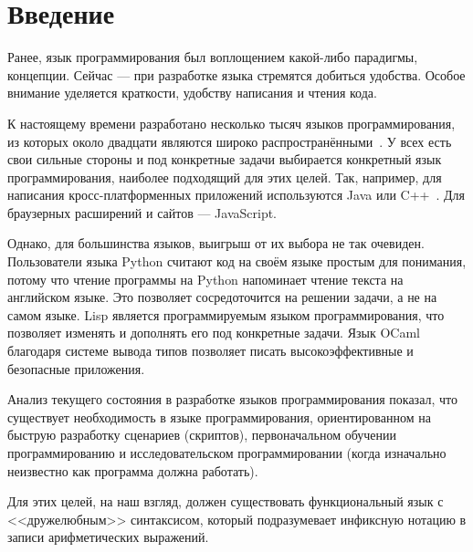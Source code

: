\section*{Введение}
    Ранее, язык программирования был воплощением какой-либо парадигмы, концепции.
    Сейчас --- при разработке языка стремятся добиться удобства.
    Особое внимание уделяется краткости, удобству написания и чтения кода.

    К настоящему времени разработано несколько тысяч языков программирования, из которых около двадцати являются широко распространёнными~\cite{TIOBE}.
    У всех есть свои сильные стороны и под конкретные задачи выбирается конкретный язык программирования, наиболее подходящий для этих целей.
    Так, например, для написания кросс-платформенных приложений используются Java или C++~\cite{p_c_lisp}.
    Для браузерных расширений и сайтов --- JavaScript.

    Однако, для большинства языков, выигрыш от их выбора не так очевиден.
    Пользователи языка Python считают код на своём языке простым для понимания, потому что чтение программы на Python напоминает чтение текста на английском языке.
    Это позволяет сосредоточится на решении задачи, а не на самом языке.
    Lisp является программируемым языком программирования, что позволяет изменять и дополнять его под конкретные задачи.
    Язык OCaml благодаря системе вывода типов позволяет писать высокоэффективные и безопасные приложения.

    Анализ текущего состояния в разработке языков программирования показал, что существует необходимость в языке программирования, ориентированном на быструю разработку сценариев (скриптов), первоначальном обучении программированию и исследовательском программировании (когда изначально неизвестно как программа должна работать).

    Для этих целей, на наш взгляд, должен существовать функциональный язык с <<дружелюбным>> синтаксисом, который подразумевает инфиксную нотацию в записи арифметических выражений.
